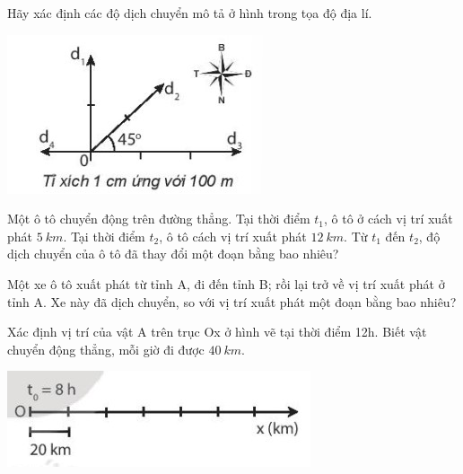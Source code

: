 \begin{ex}
	Hãy xác định các độ dịch chuyển mô tả ở hình trong tọa độ địa lí.
	
	\begin{center}
		\includegraphics[scale=1]{figs/G10Y25B3-14}
	\end{center}
\end{ex}

\begin{ex}
	Một ô tô chuyển động trên đường thẳng. Tại thời điểm $t_1$, ô tô ở cách vị trí xuất phát $\SI{5}{km}$. Tại thời điểm $t_2$, ô tô cách vị trí xuất phát $\SI{12}{km}$. Từ $t_1$ đến $t_2$, độ dịch chuyển của ô tô đã thay đổi một đoạn bằng bao nhiêu?
\end{ex}

\begin{ex}
	Một xe ô tô xuất phát từ tỉnh A, đi đến tỉnh B; rồi lại trở về vị trí xuất phát ở tỉnh A. Xe này đã dịch chuyển, so với vị trí xuất phát một đoạn bằng bao nhiêu? 
\end{ex}

\begin{ex}
	Xác định vị trí của vật A trên trục Ox ở hình vẽ tại thời điểm 12h. Biết vật chuyển động thẳng, mỗi giờ đi được $\SI{40}{km}$.
	
	\begin{center}
		\includegraphics[scale=1]{figs/G10Y25B3-9}
	\end{center}
\end{ex}

